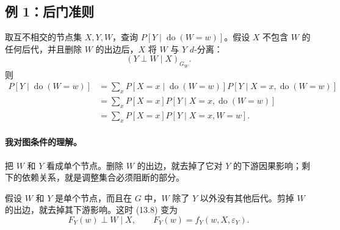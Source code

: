 \subsection{例 1：后门准则}
取互不相交的节点集 $X,Y,W$，查询 $P[Y\mid\operatorname{do}(W=w)]$。假设 $X$ 不包含 $W$ 的任何后代，并且删除 $W$ 的出边后，$X$ 将 $W$ 与 $Y$ $d$-分离：
\[
 (Y\perp W\mid X)_{G_{\underline W}}.\tag{13.8}
\]
则
\begin{align*}
 P[Y\mid\operatorname{do}(W=w)]
 &=\sum_xP[X=x\mid\operatorname{do}(W=w)]
 P[Y\mid X=x,\operatorname{do}(W=w)]\\
 &=\sum_xP[X=x]P[Y\mid X=x,\operatorname{do}(W=w)]\\
 &=\sum_xP[X=x]P[Y\mid X=x,W=w].\tag{13.9}
\end{align*}

\paragraph{我对图条件的理解。}
把 $W$ 和 $Y$ 看成单个节点。删除 $W$ 的出边，就去掉了它对 $Y$ 的下游因果影响；剩下的依赖关系，就是调整集合必须阻断的部分。

假设 $W$ 和 $Y$ 是单个节点，而且在 $G$ 中，$W$ 除了 $Y$ 以外没有其他后代。剪掉 $W$ 的出边，就去掉其下游影响。这时 (13.8) 变为
\[
 F_Y(w)\perp W\mid X,\qquad
 F_Y(w)=f_Y(w,X,\varepsilon_Y).\tag{13.10}
\]

